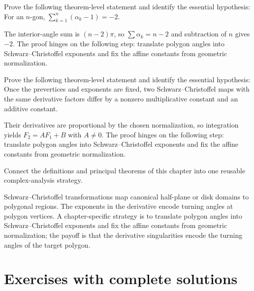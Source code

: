 \begin{problem}\label{prob:iv18-problem-10}
Prove the following theorem-level statement and identify the essential hypothesis: For an $n$-gon, $\sum_{k=1}^n(\alpha_k-1)=-2$.
\end{problem}
\begin{solution}
The interior-angle sum is $(n-2)\pi$, so $\sum\alpha_k=n-2$ and subtraction of $n$ gives $-2$. The proof hinges on the following step: translate polygon angles into Schwarz--Christoffel exponents and fix the affine constants from geometric normalization.
\end{solution}

\begin{problem}\label{prob:iv18-problem-11}
Prove the following theorem-level statement and identify the essential hypothesis: Once the prevertices and exponents are fixed, two Schwarz–Christoffel maps with the same derivative factors differ by a nonzero multiplicative constant and an additive constant.
\end{problem}
\begin{solution}
Their derivatives are proportional by the chosen normalization, so integration yields $F_2=A F_1+B$ with $A\ne0$. The proof hinges on the following step: translate polygon angles into Schwarz--Christoffel exponents and fix the affine constants from geometric normalization.
\end{solution}

\begin{problem}\label{prob:iv18-problem-12}
Connect the definitions and principal theorems of this chapter into one reusable complex-analysis strategy.
\end{problem}
\begin{solution}
Schwarz–Christoffel transformations map canonical half-plane or disk domains to polygonal regions. The exponents in the derivative encode turning angles at polygon vertices. A chapter-specific strategy is to translate polygon angles into Schwarz--Christoffel exponents and fix the affine constants from geometric normalization; the payoff is that the derivative singularities encode the turning angles of the target polygon.
\end{solution}

\section{Exercises with complete solutions}


